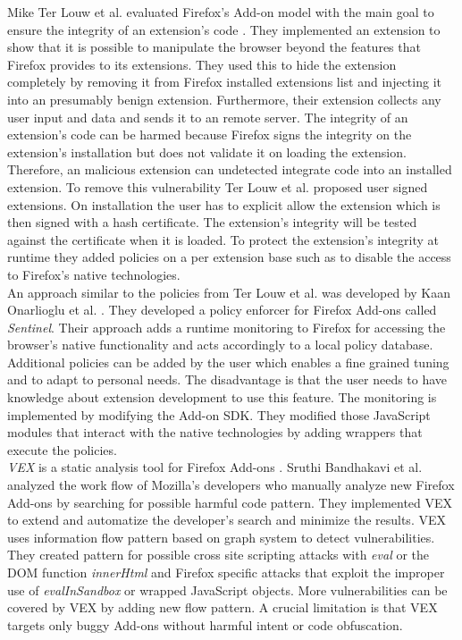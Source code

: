 \documentclass[article,colorback,accentcolor=tud9c,type=bsc]{tudthesis}
\begin{document}
	Mike Ter Louw et al. evaluated Firefox's Add-on model with the main goal to ensure the integrity of an extension's code \cite{TerLouw:2007:EWB:1420581.1420583}. They implemented an extension to show that it is possible to manipulate the browser beyond the features that Firefox provides to its extensions. They used this to hide the extension completely by removing it from Firefox installed extensions list and injecting it into an presumably benign extension. Furthermore, their extension collects any user input and data and sends it to an remote server. The integrity of an extension's code can be harmed because Firefox signs the integrity on the extension's installation but does not validate it on loading the extension. Therefore, an malicious extension can undetected integrate code into an installed extension. To remove this vulnerability Ter Louw et al. proposed user signed extensions. On installation the user has to explicit allow the extension which is then signed with a hash certificate. The extension's integrity will be tested against the certificate when it is loaded. To protect the extension's integrity at runtime they added policies on a per extension base such as to disable the access to Firefox's native technologies. \\ 
	
	An approach similar to the policies from Ter Louw et al. was developed by Kaan Onarlioglu et al. \cite{cs2015sentinel}. They developed a policy enforcer for Firefox Add-ons called \textit{Sentinel}. Their approach adds a runtime monitoring to Firefox for accessing the browser's native functionality and acts accordingly to a local policy database. Additional policies can be added by the user which enables a fine grained tuning and to adapt to personal needs. The disadvantage is that the user needs to have knowledge about extension development to use this feature. The monitoring is implemented by modifying the Add-on SDK. They modified those JavaScript modules that interact with the native technologies by adding wrappers that execute the policies. \\
	
	\textit{VEX} is a static analysis tool for Firefox Add-ons \cite{Bandhakavi:2011:VBE:1995376.1995398}. Sruthi Bandhakavi et al. analyzed the work flow of Mozilla's developers who manually analyze new Firefox Add-ons by searching for possible harmful code pattern. They implemented VEX to extend and automatize the developer's search and minimize the results. VEX uses information flow pattern based on graph system to detect vulnerabilities. They created pattern for possible cross site scripting attacks with \textit{eval} or the DOM function \textit{innerHtml} and Firefox specific attacks that exploit the improper use of \textit{evalInSandbox} or wrapped JavaScript objects. More vulnerabilities can be covered by VEX by adding new flow pattern. A crucial limitation is that VEX targets only buggy Add-ons without harmful intent or code obfuscation. \\
	
\end{document}
